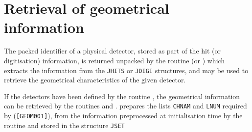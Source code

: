 \section{Retrieval of geometrical information}
 
The packed identifier of a physical detector, stored as part of the hit
(or digitisation) information, is returned unpacked by the routine
 (or ) which extracts the
information from the {\tt JHITS} or {\tt JDIGI} structures,
and may be used to retrieve the geometrical characteristics
of the given detector.

If the detectors have been defined by the routine , the
geometrical information can be retrieved by the routines 
and .  prepares the lists {\tt CHNAM} and {\tt LNUM} 
required by  ({\tt [GEOM001]}), from the information
preprocessed at initialisation time by the routine  and
stored in the structure {\tt JSET}
